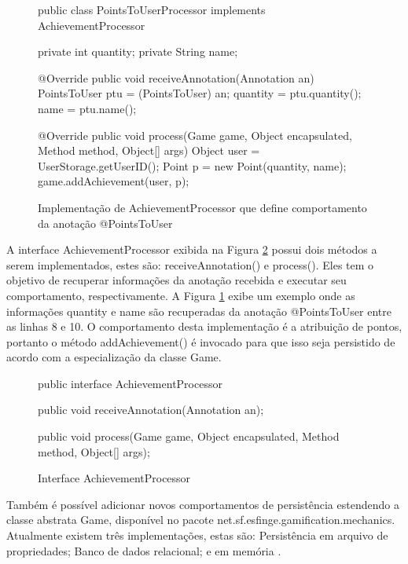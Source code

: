 \begin{figure}[H]
    \centering
    \caption{Implementação de AchievementProcessor que define comportamento da anotação @PointsToUser}
\begin{java}
public class PointsToUserProcessor implements AchievementProcessor {
	
	private int quantity;
	private String name;

	@Override
	public void receiveAnnotation(Annotation an) {
		PointsToUser ptu = (PointsToUser) an;
		quantity = ptu.quantity();
		name = ptu.name();
	}

	@Override
	public void process(Game game, Object encapsulated, Method method, Object[] args) {
		Object user = UserStorage.getUserID();
		Point p = new Point(quantity, name);
		game.addAchievement(user, p);
	}
}
    \end{java}
    \label{fig:achievement-processor-implementado}
\end{figure}

\par A interface AchievementProcessor exibida na Figura \ref{fig:achievement-processor} possui dois métodos a serem implementados, estes são: receiveAnnotation() e process(). Eles tem o objetivo de recuperar informações da anotação recebida e executar seu comportamento, respectivamente. A Figura \ref{fig:achievement-processor-implementado} exibe um exemplo onde as informações quantity e name são recuperadas da anotação @PointsToUser entre as linhas 8 e 10. O comportamento desta implementação é a atribuição de pontos, portanto o método addAchievement() é invocado para que isso seja persistido de acordo com a especialização da classe Game.

\begin{figure}[H]
    \centering
    \caption{Interface AchievementProcessor}
    \begin{java}
public interface AchievementProcessor {
	
	public void receiveAnnotation(Annotation an);
	
	public void process(Game game, Object encapsulated, Method method, Object[] args);

}
    \end{java}
    \label{fig:achievement-processor}
\end{figure}

\par Também é possível adicionar novos comportamentos de persistência estendendo a classe abstrata Game, disponível no pacote net.sf.esfinge.gamification.mechanics. Atualmente existem três implementações, estas são: Persistência em arquivo de propriedades; Banco de dados relacional; e em memória \cite{esfingegamification2011}.


